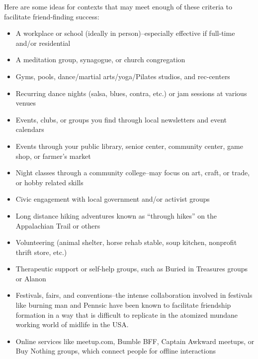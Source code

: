 \documentclass[12pt,letterpaper]{book}
\begin{document}
Here are some ideas for contexts that may meet enough of these criteria to facilitate friend-finding success:
\begin{itemize}
	\item A workplace or school (ideally in person)–especially effective if full-time and/or residential
	\item A meditation group, synagogue, or church congregation
	\item Gyms, pools, dance/martial arts/yoga/Pilates studios, and rec-centers
	\item Recurring dance nights (salsa, blues, contra, etc.) or jam sessions at various venues
	\item Events, clubs, or groups you find through local newsletters and event calendars
	\item Events through your public library, senior center, community center, game shop, or farmer's market
	\item Night classes through a community college–may focus on art, craft, or trade, or hobby related skills
	\item Civic engagement with local government and/or activist groups
	\item Long distance hiking adventures known as “through hikes” on the Appalachian Trail or others
	\item Volunteering (animal shelter, horse rehab stable, soup kitchen, nonprofit thrift store, etc.)
	\item Therapeutic support or self-help groups, such as Buried in Treasures groups or Alanon
	\item Festivals, fairs, and conventions–the intense collaboration involved in festivals like burning man \cite{st2018civilised} and Pennsic have been known to facilitate friendship formation in a way that is difficult to replicate in the atomized mundane working world of midlife in the USA.
	\item Online services like meetup.com, Bumble BFF, Captain Awkward meetups, or Buy Nothing groups, which connect people for offline interactions
\end{itemize}
\end{document}
